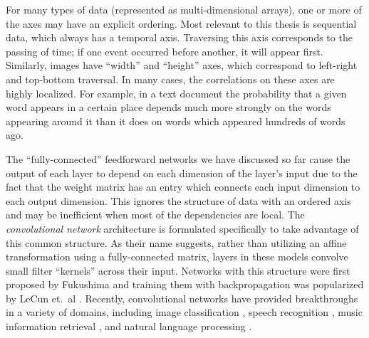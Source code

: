 For many types of data (represented as multi-dimensional arrays), one or more of the axes may have an explicit ordering.
Most relevant to this thesis is sequential data, which always has a temporal axis.
Traversing this axis corresponds to the passing of time; if one event occurred before another, it will appear first.
Similarly, images have ``width'' and ``height'' axes, which correspond to left-right and top-bottom traversal.
In many cases, the correlations on these axes are highly localized.
For example, in a text document the probability that a given word appears in a certain place depends much more strongly on the words appearing around it than it does on words which appeared hundreds of words ago.

The ``fully-connected'' feedforward networks we have discussed so far cause the output of each layer to depend on each dimension of the layer's input due to the fact that the weight matrix has an entry which connects each input dimension to each output dimension.
This ignores the structure of data with an ordered axis and may be inefficient when most of the dependencies are local.
The {\em convolutional network} architecture is formulated specifically to take advantage of this common structure.
As their name suggests, rather than utilizing an affine transformation using a fully-connected matrix, layers in these models convolve small filter ``kernels'' across their input.
Networks with this structure were first proposed by Fukushima \cite{} and training them with backpropagation was popularized by LeCun et.\ al \cite{}.
Recently, convolutional networks have provided breakthroughs in a variety of domains, including image classification \cite{}, speech recognition \cite{}, music information retrieval \cite{}, and natural language processing \cite{}.

